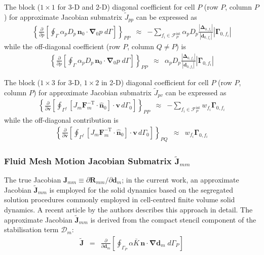 \documentclass[sn-mathphys,Numbered]{sn-jnl}%
\newcommand{\bb}{\boldsymbol}
\begin{document}
The block ($1\times1$ for 3-D and 2-D) diagonal coefficient for cell $P$ (row $P$, column $P$) for approximate Jacobian submatrix $\tilde{J}_{pp}$ can be expressed as
\begin{eqnarray}
	\left\{
    	\frac{\partial}{\partial p}
	\left[
		\oint_{\Gamma} \alpha_p D_p \, \bb{n}_0 \cdot \bb{\nabla}_0 p \; d\Gamma
	\right]
	\right\}_{PP}
	&\approx&
		- \sum_{f_i \in \mathcal{F}^{\text{int}}_P}  \alpha_p D_p
		\frac{ \left|\bb{\Delta}_{0,f_i} \right| }{\left|\bb{d}_{0,f_i}\right|}    \left|\bb{\Gamma}_{0,f_i}\right|
\end{eqnarray}
while the off-diagonal coefficient (row $P$, column $Q \neq P$) is
\begin{eqnarray}
	\left\{
    	\frac{\partial}{\partial p}
	\left[
		\oint_{\Gamma} \alpha_p D_p \, \bb{n}_0 \cdot \bb{\nabla}_0 p \; d\Gamma
	\right]
	\right\}_{PP}
	&\approx&	   \alpha_p D_p \frac{ \left|\bb{\Delta}_{0,f_i} \right| }{\left|\bb{d}_{0,f_i}\right|}    \left|\bb{\Gamma}_{0,f_i}\right|
\end{eqnarray}


The block ($1\times3$ for 3-D, $1\times2$ in 2-D) diagonal coefficient for cell $P$ (row $P$, column $P$) for approximate Jacobian submatrix $\tilde{J}_{pv}$ can be expressed as
\begin{eqnarray}
	\left\{
    	\frac{\partial}{\partial \bb{v}}
	\left[
		\oint_{\Gamma^f}  \left[ J_m \bb{F}_m^{-\text{T}}  \cdot \hat{\bb{n}}_0 \right] \cdot \bb{v} \, d\Gamma_0
	\right]
	\right\}_{PP}
	&\approx&
		- \sum_{f_i \in \mathcal{F}^{\text{int}}_P} 	w_{f_i} \bb{\Gamma}_{0, f_i}
\end{eqnarray}
while the off-diagonal contribution is
\begin{eqnarray}
	\left\{
    	\frac{\partial}{\partial \bb{v}}
	\left[
		\oint_{\Gamma^f}  \left[ J_m \bb{F}_m^{-\text{T}}  \cdot \hat{\bb{n}}_0 \right] \cdot \bb{v} \, d\Gamma_0
	\right]
	\right\}_{PQ}
	&\approx& w_{f_i} \bb{\Gamma}_{0, f_i}
\end{eqnarray}


\subsubsection[Fluid Mesh Motion Jacobian Submatrices]{Fluid Mesh Motion Jacobian Submatrix $\tilde{\bb{J}}_{mm}$}
The true Jacobian $\bb{J}_{mm} \equiv \partial \bb{R}_{mm}/\partial \bb{d}_m$; in the current work, an approximate Jacobian $\tilde{\bb{J}}_{mm}$ is employed for the solid dynamics based on the segregated solution procedures commonly employed in cell-centred finite volume solid dynamics.
A recent article \citep{Cardiff2025jfnk} by the authors describes this approach in detail.
The approximate Jacobian $\tilde{\bb{J}}_{mm}$ is derived from the compact stencil component of the stabilisation term $\bb{\mathcal{D}}_m$:
\begin{eqnarray}
	\tilde{\bb{J}} &=& \frac{\partial}{\partial \bb{d}_m} \left[ \oint_{\Gamma_P} \alpha \bar{K} \, \bb{n} \cdot \bb{\nabla} \bb{d}_m \; d\Gamma_P \right]
\end{eqnarray}
\end{document}
